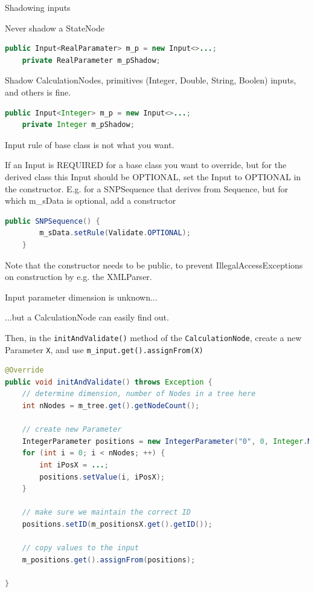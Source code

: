 \documentclass{beamer}
\theoremstyle{definition}
\begin{document}
\begin{frame}[containsverbatim]{Shadowing inputs}

Never shadow a StateNode

\begin{lstlisting}[language=java]
    public Input<RealParamater> m_p = new Input<>...;
    private RealParameter m_pShadow;
\end{lstlisting}


Shadow CalculationNodes, 
primitives (Integer, Double, String, Boolen) inputs, 
and others is fine.


\begin{lstlisting}[language=java]
    public Input<Integer> m_p = new Input<>...;
    private Integer m_pShadow;
\end{lstlisting}


\end{frame}

\begin{frame}[containsverbatim]{Input rule of base class is not what you want.}

If an Input is REQUIRED for a base class you want to override, but for the derived
class this Input should be OPTIONAL, set the Input to OPTIONAL in the constructor.
E.g. for a SNPSequence that derives from Sequence, but for which m\_sData is optional,
add a constructor

{\color{blue}\begin{lstlisting}[language=java]
	public SNPSequence() {
		m_sData.setRule(Validate.OPTIONAL);
	}
\end{lstlisting}}
Note that the constructor needs to be public, to prevent IllegalAccessExceptions
on construction by e.g. the XMLParser.

\end{frame}

\begin{frame}[containsverbatim]{Input parameter dimension is unknown...}

...but a CalculationNode can easily find out.\vskip 0.5cm

Then, in the {\tt initAndValidate()} method of the {\tt CalculationNode},
create a new Parameter {\tt X}, and use {\tt m\_input.get().assignFrom(X)}


\begin{lstlisting}[language=java]
@Override
public void initAndValidate() throws Exception {
    // determine dimension, number of Nodes in a tree here
	int nNodes = m_tree.get().getNodeCount();

    // create new Parameter
	IntegerParameter positions = new IntegerParameter("0", 0, Integer.MAX_VALUE, nNodes);
	for (int i = 0; i < nNodes; ++) {
		int iPosX = ...;
		positions.setValue(i, iPosX);
	}

    // make sure we maintain the correct ID
	positions.setID(m_positionsX.get().getID());

    // copy values to the input
	m_positions.get().assignFrom(positions);
	
}
\end{lstlisting}

\end{frame}
\end{document}
